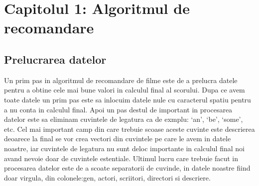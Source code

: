 \chapter{Capitolul 1: Algoritmul de recomandare }
\label{chap:ch1}

\section{Prelucrarea datelor}
\label{sec:ch3sec1}
\par Un prim pas in algoritmul de recomandare de filme este de a prelucra datele pentru a obtine cele mai bune valori in calculul final al scorului. Dupa ce avem toate datele un prim pas este sa inlocuim datele nule cu caracterul spatiu pentru a nu conta in calculul final. Apoi un pas destul de important in procesarea datelor este sa eliminam cuvintele de legatura ca de exmplu:  ‘an’, ‘be’, ‘some’, etc.  Cel mai important camp din care trebuie scoase aceste cuvinte este descrierea deoarece la final se vor crea vectori din cuvintele pe care le avem in datele noastre, iar cuvintele de legatura nu sunt deloc importante in calculul final noi avand nevoie doar de cuvintele estentiale. Ultimul lucru care trebuie facut in procesarea datelor este de a scoate separatorii de cuvinde, in datele noastre fiind doar virgula, din colonele:gen, actori, scriitori, directori si descriere. 

